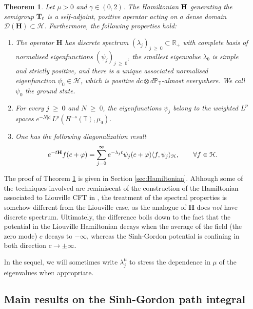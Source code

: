 \documentclass[11pt]{amsart}
\numberwithin{equation}{section}
\newtheorem{theorem}{Theorem}[section]
\theoremstyle{definition}
\renewcommand{\geq}{\;\geqslant\;}                   %
\newcommand{\R}{\mathbb{R}}
\newcommand{\mc}{\mathcal}
\def\T{\mathbb{T}}
\begin{document}
\begin{theorem}\label{thm:spectrum_H}
Let $\mu > 0$ and $\gamma\in(0,2)$. The Hamiltonian ${\bf H}$ generating the semigroup ${\bf T}_t$ is a self-adjoint, positive operator acting on a dense domain $\mathcal{D}(\mathbf{H}) \subset \mathcal{H}$. Furthermore, the following properties hold:
\begin{enumerate}
\item The operator $\mathbf{H}$ has discrete spectrum $(\lambda_j)_{j \geq 0}\subset \R_+$  with complete basis of normalised eigenfunctions $(\psi_j)_{j \geq 0}$,  the smallest eigenvalue $\lambda_0$ is simple and strictly positive, and there is  a unique associated normalised eigenfunction $\psi_0\in \mc{H}$, which is positive $dc\otimes d\mathbb P_\T$-almost everywhere. We call $\psi_0$ the ground state.
\item For every $j \geq 0$ and $N \geq 0$, the eigenfunctions $\psi_j$ belong to the weighted $L^p$ spaces $e^{-N|c|}L^p(H^{-s}(\T),\mu_0)$.
\item  One has the following diagonalization result
\begin{equation}\label{introdiagonalize}
e^{-t{\bf H}}f(c+\varphi)= \sum_{j=0}^{\infty} e^{-\lambda_j t}\psi_j(c+\varphi)
\langle f, \psi_j \rangle_{\mc{H}}, \qquad \forall f \in \mathcal{H}.
\end{equation}
\end{enumerate}
\end{theorem}


The proof of Theorem \ref{thm:spectrum_H} is given in Section \ref{sec:Hamiltonian}. Although some of the techniques involved are reminiscent of the construction of the Hamiltonian associated to Liouville CFT in \cite{GKRV}, the treatment of the spectral properties is somehow different
from the Liouville case, as the analogue of $\mathbf H$ does \emph{not} have discrete spectrum. Ultimately, the difference boils down to the fact that the potential  in the Liouville Hamiltonian  decays when the average of the field (the zero mode) $c$ decays to $-\infty$, whereas the Sinh-Gordon potential is confining in both direction $c\to \pm \infty$.


In the sequel, we will sometimes write $\lambda_{j}^\mu$ to stress the dependence in $\mu$ of the eigenvalues when appropriate. 




\subsection{Main results on the Sinh-Gordon path integral}
\end{document}
